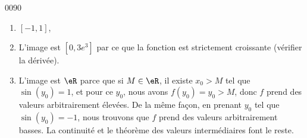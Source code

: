 
\begin{corrige}{0090}

\begin{enumerate}

\item
$[-1,1]$,
\item
L'image est $[0,3e^3]$ par ce que la fonction est strictement croissante (vérifier la dérivée).

\item
L'image est $\eR$ parce que si $M\in \eR$, il existe $x_0>M$ tel que $\sin(y_0)=1$, et pour ce $y_0$, nous avons $f(y_0)=y_0>M$, donc $f$ prend des valeurs arbitrairement élevées. De la même façon, en prenant $y_0$ tel que $\sin(y_0)=-1$, nous trouvons que $f$ prend des valeurs arbitrairement basses.
La continuité et le théorème des valeurs intermédiaires font le reste.

\end{enumerate}

\end{corrige}

